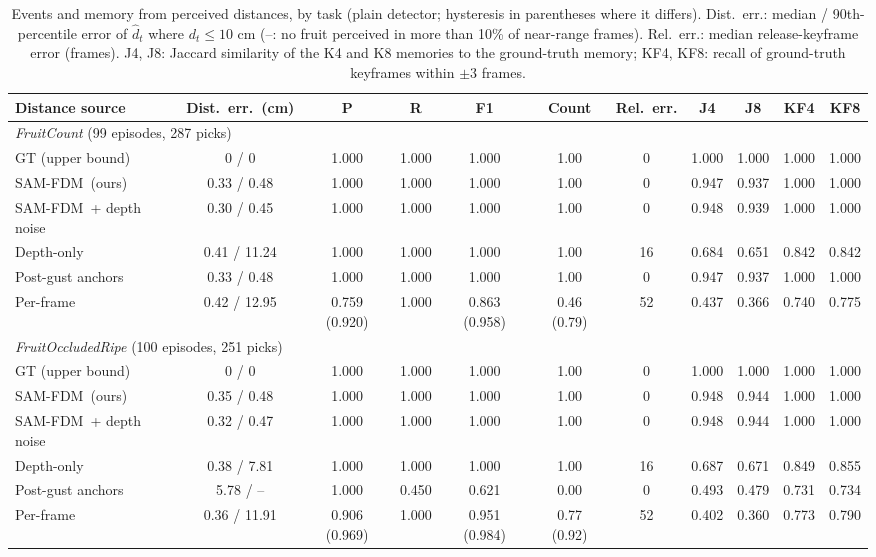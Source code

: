 \documentclass[preprint,12pt,authoryear]{elsarticle}
\newcommand{\fdm}{SAM-FDM}
\begin{document}
\begin{table}[h]
\centering
\caption{Events and memory from perceived distances, by task (plain detector; hysteresis in parentheses where it differs). Dist.\ err.: median / 90th-percentile error of $\hat d_t$ where $d_t \le 10$ cm (--: no fruit perceived in more than 10\% of near-range frames). Rel.\ err.: median release-keyframe error (frames). J4, J8: Jaccard similarity of the K4 and K8 memories to the ground-truth memory; KF4, KF8: recall of ground-truth keyframes within $\pm3$ frames.}
\label{tab:s_chain}
\footnotesize
\setlength{\tabcolsep}{3.5pt}
\begin{adjustbox}{max width=\textwidth}\begin{tabular}{lcccccccccc}
\toprule
Distance source & Dist.\ err.\ (cm) & P & R & F1 & Count & Rel.\ err. & J4 & J8 & KF4 & KF8\\
\midrule
\multicolumn{11}{l}{\emph{FruitCount} (99 episodes, 287 picks)}\\
GT (upper bound) & 0 / 0 & 1.000 & 1.000 & 1.000 & 1.00 & 0 & 1.000 & 1.000 & 1.000 & 1.000\\
\fdm\ (ours) & 0.33 / 0.48 & 1.000 & 1.000 & 1.000 & 1.00 & 0 & 0.947 & 0.937 & 1.000 & 1.000\\
\fdm\ + depth noise & 0.30 / 0.45 & 1.000 & 1.000 & 1.000 & 1.00 & 0 & 0.948 & 0.939 & 1.000 & 1.000\\
Depth-only & 0.41 / 11.24 & 1.000 & 1.000 & 1.000 & 1.00 & 16 & 0.684 & 0.651 & 0.842 & 0.842\\
Post-gust anchors & 0.33 / 0.48 & 1.000 & 1.000 & 1.000 & 1.00 & 0 & 0.947 & 0.937 & 1.000 & 1.000\\
Per-frame & 0.42 / 12.95 & 0.759 (0.920) & 1.000 & 0.863 (0.958) & 0.46 (0.79) & 52 & 0.437 & 0.366 & 0.740 & 0.775\\
\midrule
\multicolumn{11}{l}{\emph{FruitOccludedRipe} (100 episodes, 251 picks)}\\
GT (upper bound) & 0 / 0 & 1.000 & 1.000 & 1.000 & 1.00 & 0 & 1.000 & 1.000 & 1.000 & 1.000\\
\fdm\ (ours) & 0.35 / 0.48 & 1.000 & 1.000 & 1.000 & 1.00 & 0 & 0.948 & 0.944 & 1.000 & 1.000\\
\fdm\ + depth noise & 0.32 / 0.47 & 1.000 & 1.000 & 1.000 & 1.00 & 0 & 0.948 & 0.944 & 1.000 & 1.000\\
Depth-only & 0.38 / 7.81 & 1.000 & 1.000 & 1.000 & 1.00 & 16 & 0.687 & 0.671 & 0.849 & 0.855\\
Post-gust anchors & 5.78 / -- & 1.000 & 0.450 & 0.621 & 0.00 & 0 & 0.493 & 0.479 & 0.731 & 0.734\\
Per-frame & 0.36 / 11.91 & 0.906 (0.969) & 1.000 & 0.951 (0.984) & 0.77 (0.92) & 52 & 0.402 & 0.360 & 0.773 & 0.790\\
\bottomrule
\end{tabular}\end{adjustbox}
\end{table}
\end{document}
